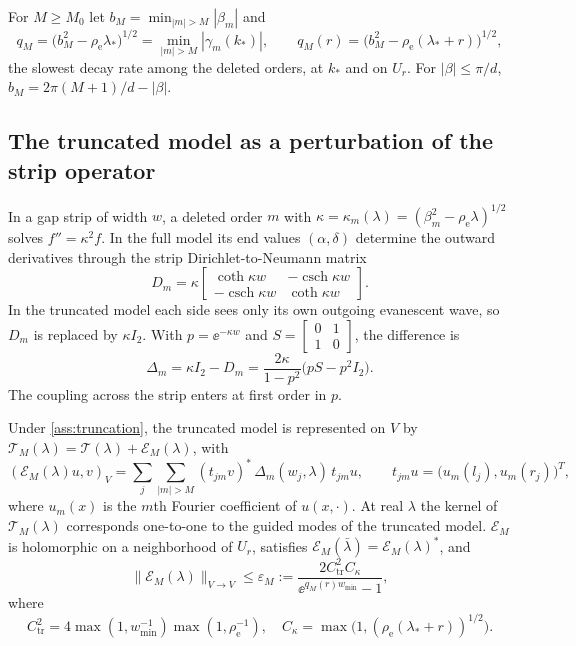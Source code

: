 For $M\ge M_0$ let $b_M=\min_{|m|>M}|\beta_m|$ and
\[
  q_M=\bigl(b_M^2-\rho_{\mathrm e}\lambda_*\bigr)^{1/2}=\min_{|m|>M}|\gamma_m(k_*)|,
  \qquad
  q_M(r)=\bigl(b_M^2-\rho_{\mathrm e}(\lambda_*+r)\bigr)^{1/2},
\]
the slowest decay rate among the deleted orders, at $k_*$ and on $U_r$. For
$|\beta|\le\pi/d$, $b_M=2\pi(M+1)/d-|\beta|$.

\subsection{The truncated model as a perturbation of the strip operator}
In a gap strip of width $w$, a deleted order $m$ with
$\kappa=\kappa_m(\lambda)=(\beta_m^2-\rho_{\mathrm e}\lambda)^{1/2}$ solves $f''=\kappa^2f$.
In the full model its end values $(\alpha,\delta)$ determine the outward
derivatives through the strip Dirichlet-to-Neumann matrix
\[
  D_m=\kappa\begin{bmatrix}\coth\kappa w&-\operatorname{csch}\kappa w\\
                    -\operatorname{csch}\kappa w&\coth\kappa w\end{bmatrix}.
\]
In the truncated model each side sees only its own outgoing evanescent wave,
so $D_m$ is replaced by $\kappa I_2$. With $p=\ee^{-\kappa w}$ and
$S=\left[\begin{smallmatrix}0&1\\1&0\end{smallmatrix}\right]$, the difference is
\begin{equation}\label{eq:strip-defect}
  \Delta_m=\kappa I_2-D_m=\frac{2\kappa}{1-p^2}\bigl(pS-p^2I_2\bigr).
\end{equation}
The coupling across the strip enters at first order in $p$.

\begin{proposition}[compression]\label{prop:compression}
Under \cref{ass:truncation}, the truncated model is represented on $V$ by
$\mathcal T_M(\lambda)=\mathcal T(\lambda)+\mathcal E_M(\lambda)$, with
\[
  (\mathcal E_M(\lambda)u,v)_V=\sum_j\sum_{|m|>M}(t_{jm}v)^*\,\Delta_m(w_j,\lambda)\,t_{jm}u,
  \qquad t_{jm}u=\bigl(u_m(l_j),u_m(r_j)\bigr)^T,
\]
where $u_m(x)$ is the $m$th Fourier coefficient of $u(x,\cdot)$. At real
$\lambda$ the kernel of $\mathcal T_M(\lambda)$ corresponds one-to-one to the guided
modes of the truncated model. $\mathcal E_M$ is holomorphic on a neighborhood
of $U_r$, satisfies $\mathcal E_M(\bar\lambda)=\mathcal E_M(\lambda)^*$, and
\begin{equation}\label{eq:compression-bound}
  \|\mathcal E_M(\lambda)\|_{V\to V}\le\varepsilon_M:=
  \frac{2C_{\mathrm{tr}}^2C_\kappa}{\ee^{q_M(r)w_{\min}}-1},
\end{equation}
where
\[
  C_{\mathrm{tr}}^2=4\max(1,w_{\min}^{-1})\max(1,\rho_{\mathrm e}^{-1}),\quad
  C_\kappa=\max\bigl(1,(\rho_{\mathrm e}(\lambda_*+r))^{1/2}\bigr).
\]
\end{proposition}

